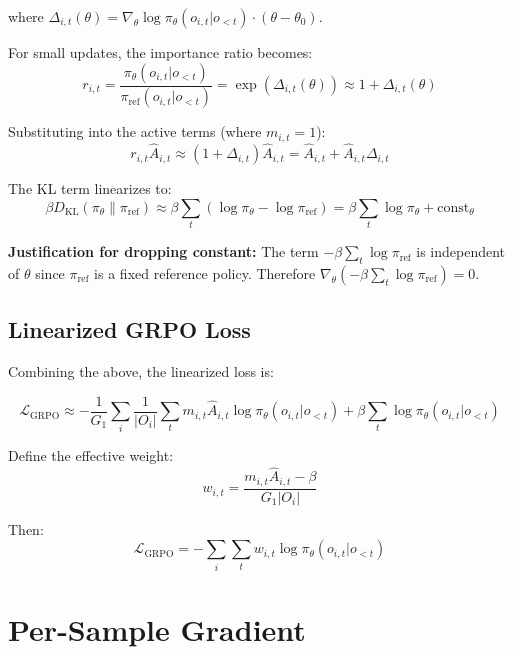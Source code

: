 \documentclass{article}
\begin{document}
where $\Delta_{i,t}(\theta) = \nabla_\theta \log \pi_{\theta}(o_{i,t}|o_{<t}) \cdot (\theta - \theta_0)$.

For small updates, the importance ratio becomes:
\begin{equation}
r_{i,t} = \frac{\pi_\theta(o_{i,t}|o_{<t})}{\pi_{\text{ref}}(o_{i,t}|o_{<t})} = \exp(\Delta_{i,t}(\theta)) \approx 1 + \Delta_{i,t}(\theta)
\end{equation}

Substituting into the active terms (where $m_{i,t} = 1$):
\begin{equation}
r_{i,t} \hat{A}_{i,t} \approx (1 + \Delta_{i,t}) \hat{A}_{i,t} = \hat{A}_{i,t} + \hat{A}_{i,t}\Delta_{i,t}
\end{equation}

The KL term linearizes to:
\begin{equation}
\beta D_{\text{KL}}(\pi_\theta \| \pi_{\text{ref}}) \approx \beta \sum_t (\log\pi_\theta - \log\pi_{\text{ref}}) = \beta\sum_t \log\pi_\theta + \text{const}_\theta
\end{equation}

\textbf{Justification for dropping constant:} The term $-\beta\sum_t \log\pi_{\text{ref}}$ is independent of $\theta$ since $\pi_{\text{ref}}$ is a fixed reference policy. Therefore $\nabla_\theta(-\beta\sum_t \log\pi_{\text{ref}}) = 0$.

\subsection{Linearized GRPO Loss}

Combining the above, the linearized loss is:

\begin{equation}\label{eq:linearized_loss}
\boxed{
\mathcal{L}_{\text{GRPO}} \approx -\frac{1}{G_1}\sum_{i}\frac{1}{|O_i|}\sum_t m_{i,t}\hat{A}_{i,t}\log\pi_\theta(o_{i,t}|o_{<t}) + \beta\sum_t \log\pi_\theta(o_{i,t}|o_{<t})
}
\end{equation}

Define the effective weight:
\begin{equation}
w_{i,t} = \frac{m_{i,t}\hat{A}_{i,t} - \beta}{G_1|O_i|}
\end{equation}

Then:
\begin{equation}
\mathcal{L}_{\text{GRPO}} = -\sum_i\sum_t w_{i,t} \log\pi_\theta(o_{i,t}|o_{<t})
\end{equation}

\section{Per-Sample Gradient}
\end{document}
